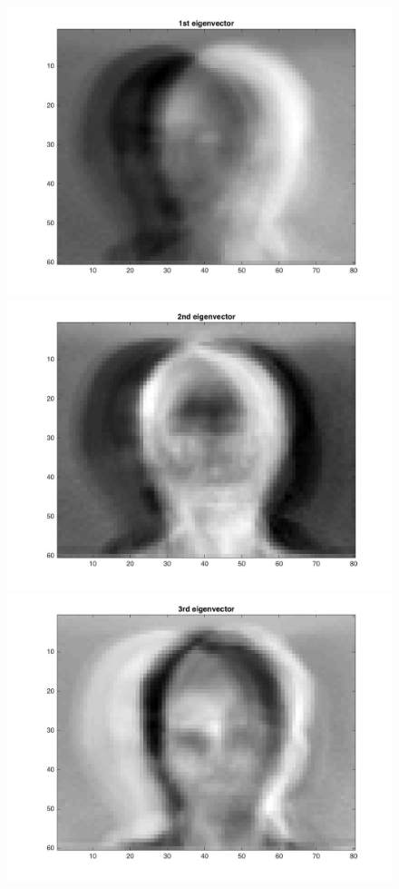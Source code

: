 \documentclass{article}
\begin{document}
\begin{figure}[H]
  \includegraphics[scale =.5]{report7_1}
\includegraphics[scale =.5]{report7_2}
\includegraphics[scale =.5]{report7_3}

\end{figure}
\end{document}
